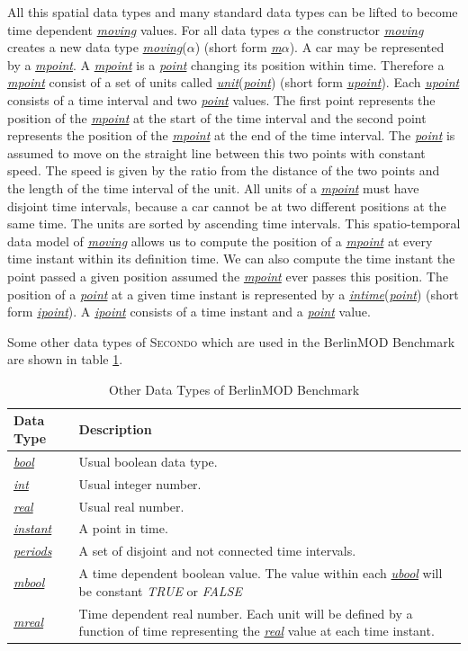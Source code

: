 \documentclass[a4paper]{article}
\newcommand{\secondo}{\textsc{Secondo}}
\newcommand{\bmodb} {BerlinMOD Benchmark}
\newcommand{\var}[1]{\textsl{#1}}
\newcommand{\dt}[1]{\textsl{\underline{#1}}}
\newcommand{\true}{\var{TRUE}}
\newcommand{\false}{\var{FALSE}}
\begin{document}
All this spatial data types and many standard data types can be lifted to become time dependent \dt{moving} values. For all data types \dt{$\alpha$} the constructor \dt{moving} creates a new data type \dt{moving}(\dt{$\alpha$}) (short form \dt{m$\alpha$}). A car may be represented by a \dt{mpoint}. A \dt{mpoint} is a \dt{point} changing its position within time. Therefore a \dt{mpoint} consist of a set of units called \dt{unit}(\dt{point}) (short form \dt{upoint}). Each \dt{upoint} consists of a time interval and two \dt{point} values. The first point represents the position of the \dt{mpoint} at the start of the time interval and the second point represents the position of the \dt{mpoint} at the end of the time interval. The \dt{point} is assumed to move on the straight line between this two points with constant speed. The speed is given by the ratio from the distance of the two points and the length of the time interval of the unit. All units of a \dt{mpoint} must have disjoint time intervals, because a car cannot be at two different positions at the same time. The units are sorted by ascending time intervals. This spatio-temporal data model of \dt{moving} allows us to compute the position of a \dt{mpoint} at every time instant within its definition time. We can also compute the time instant the point passed a given position assumed the \dt{mpoint} ever passes this position. The position of a \dt{point} at a given time instant is represented by a \dt{intime}(\dt{point}) (short form \dt{ipoint}). A \dt{ipoint} consists of a time instant and a \dt{point} value.

Some other data types of \secondo{} which are used in the \bmodb{} are shown in table \ref{tab:bmodbdatatypes}.
\begin{table}[H]
\begin{center}
\begin{scriptsize}
\begin{tabular}{|l|p{9.5cm}|}
\hline
\textbf{Data Type} & \textbf{Description} \\
\hline
\dt{bool} & Usual boolean data type.\\
\hline
\dt{int} & Usual integer number.\\
\hline
\dt{real} & Usual real number.\\
\hline
\dt{instant} & A point in time.\\
\hline
\dt{periods} & A set of disjoint and not connected time intervals.\\
\hline
\dt{mbool} & A time dependent boolean value. The value within each \dt{ubool} will be constant \true{} or \false{} \\
\hline
\dt{mreal} & Time dependent real number. Each unit will be defined by a function of time representing the \dt{real} value at each time instant.\\
\hline
\end{tabular}
\end{scriptsize}
\caption{Other Data Types of \bmodb{}}
\label{tab:bmodbdatatypes}
\end{center}
\end{table}
\end{document}
